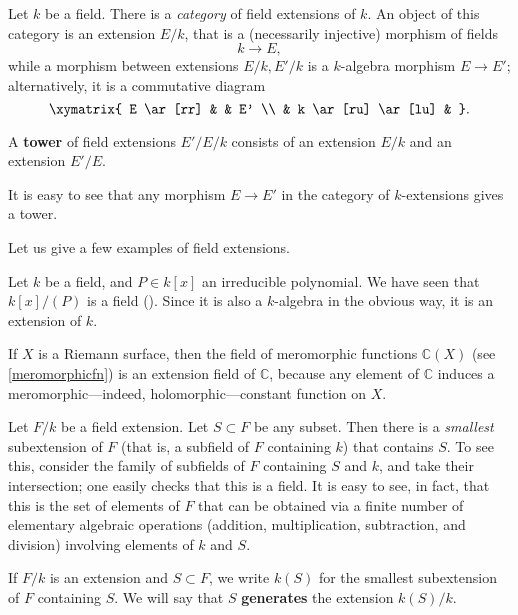 Let $k$ be a field. There is a \emph{category} of field extensions of $k$. 
An object of this category is an extension $E/k$, that is a
(necessarily injective) morphism of fields
\[ k \to E,  \]
while a morphism between extensions $E/k, E'/k$ is a $k$-algebra morphism $E \to E'$;
alternatively, it is a commutative diagram
\[ \xymatrix{
E \ar[rr] & & E' \\
& k \ar[ru] \ar[lu] &
}.\]


\begin{definition} 
A \textbf{tower} of field extensions $E'/E/k$ consists of an extension $E/k$
and an extension $E'/E$.
\end{definition} 

It is easy to see that any morphism $E \to E'$ in the category of
$k$-extensions gives a tower. 


Let us give a few examples of field extensions.

\begin{example} 
Let $k$ be a field, and $P \in k[x]$ an irreducible polynomial. We have seen
that $k[x]/(P)$ is a field (). Since it is also a $k$-algebra
in the obvious way, it is an extension of $k$.
\end{example} 

\begin{example} 
If $X$ is a Riemann surface, then the field of meromorphic functions
$\mathbb{C}(X)$ (see \cref{meromorphicfn}) is an extension field of
$\mathbb{C}$, because any element of $\mathbb{C}$ induces a
meromorphic---indeed, holomorphic---constant function on $X$.
\end{example} 

Let $F/k$ be a field extension. Let $S \subset F$ be any subset. 
Then there is a  \emph{smallest} subextension of $F$ (that is, a subfield of $F$ containing $k$) 
that contains $S$.
To see this, consider the family of subfields of $F $ containing $S$ and
$k$, and take their intersection; one easily checks that this is a field.
It is easy to see, in fact, that this is the set of elements of $F$ that can
be obtained via  a finite number of elementary algebraic operations
(addition, multiplication, subtraction, and division) involving elements of
$k$ and $S$.

\begin{definition} 
If $F/k$ is an extension and $S \subset F$, we write $k(S)$ for the smallest
subextension of $F$ containing $S$.
We will say that $S$ \textbf{generates} the extension $k(S)/k$.
\end{definition} 

